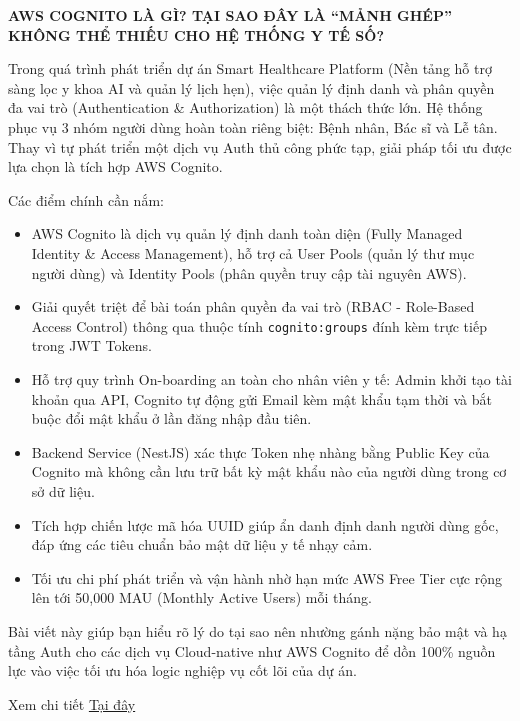 \vspace{0.5em}\noindent\textbf{AWS COGNITO LÀ GÌ? TẠI SAO ĐÂY LÀ ``MẢNH GHÉP'' KHÔNG THỂ THIẾU
CHO HỆ THỐNG Y TẾ SỐ?}

Trong quá trình phát triển dự án Smart Healthcare Platform (Nền tảng hỗ
trợ sàng lọc y khoa AI và quản lý lịch hẹn), việc quản lý định danh và
phân quyền đa vai trò (Authentication \& Authorization) là một thách
thức lớn. Hệ thống phục vụ 3 nhóm người dùng hoàn toàn riêng biệt: Bệnh
nhân, Bác sĩ và Lễ tân. Thay vì tự phát triển một dịch vụ Auth thủ công
phức tạp, giải pháp tối ưu được lựa chọn là tích hợp AWS Cognito.

Các điểm chính cần nắm:

\begin{itemize}
\tightlist
\item
  AWS Cognito là dịch vụ quản lý định danh toàn diện (Fully Managed
  Identity \& Access Management), hỗ trợ cả User Pools (quản lý thư mục
  người dùng) và Identity Pools (phân quyền truy cập tài nguyên AWS).
\item
  Giải quyết triệt để bài toán phân quyền đa vai trò (RBAC - Role-Based
  Access Control) thông qua thuộc tính \texttt{cognito:groups} đính kèm
  trực tiếp trong JWT Tokens.
\item
  Hỗ trợ quy trình On-boarding an toàn cho nhân viên y tế: Admin khởi
  tạo tài khoản qua API, Cognito tự động gửi Email kèm mật khẩu tạm thời
  và bắt buộc đổi mật khẩu ở lần đăng nhập đầu tiên.
\item
  Backend Service (NestJS) xác thực Token nhẹ nhàng bằng Public Key của
  Cognito mà không cần lưu trữ bất kỳ mật khẩu nào của người dùng trong
  cơ sở dữ liệu.
\item
  Tích hợp chiến lược mã hóa UUID giúp ẩn danh định danh người dùng gốc,
  đáp ứng các tiêu chuẩn bảo mật dữ liệu y tế nhạy cảm.
\item
  Tối ưu chi phí phát triển và vận hành nhờ hạn mức AWS Free Tier cực
  rộng lên tới 50,000 MAU (Monthly Active Users) mỗi tháng.
\end{itemize}

Bài viết này giúp bạn hiểu rõ lý do tại sao nên nhường gánh nặng bảo mật
và hạ tầng Auth cho các dịch vụ Cloud-native như AWS Cognito để dồn
100\% nguồn lực vào việc tối ưu hóa logic nghiệp vụ cốt lõi của dự án.

Xem chi tiết
\href{https://www.facebook.com/groups/awsstudygroupfcj/permalink/2228021697962790/?rdid=MLFJXbxXfs8sMMKH\#}{Tại
đây}

